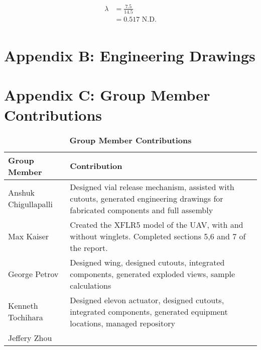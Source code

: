 \begin{enumerate}[wide,label=\textbf{\arabic*}., labelindent=0pt]
        \begin{align*}
            \lambda &= \frac{7.5}{14.5}\\
            &= 0.517 \text{ N.D.}\\
        \end{align*}    
 
\section*{Appendix B: Engineering Drawings}\label{ApxB}











\section*{Appendix C: Group Member Contributions}

    \begin{table}[H]
        \begin{center} 
        \caption{\textbf{Group Member Contributions}}
        \begin{tabular}{ | p{2in} | p{4in}| } 
            \hline
            \textbf{Group Member} & \textbf{Contribution} \\  \hline
            Anshuk Chigullapalli & Designed vial release mechanism, assisted with cutouts, generated engineering drawings for fabricated components and full assembly\\ \hline
            Max Kaiser & Created the XFLR5 model of the UAV, with and without winglets. Completed sections 5,6 and 7 of the report. \\ \hline
            George Petrov & Designed wing, designed cutouts, integrated components, generated exploded views, sample calculations \\ \hline
            Kenneth Tochihara & Designed elevon actuator, designed cutouts, integrated components, generated equipment locations, managed repository \\ \hline
            Jeffery Zhou & \\ \hline
        \end{tabular}
        \end{center}
    \end{table}
    
\end{enumerate}